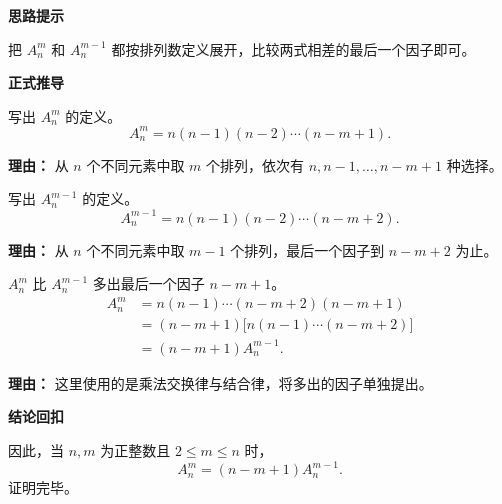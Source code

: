 \begin{proofbox}
\textbf{\textcolor{CProof}{思路提示}}

把 $A_n^m$ 和 $A_n^{m-1}$ 都按排列数定义展开，比较两式相差的最后一个因子即可。

\medskip
\textbf{\textcolor{CProof}{正式推导}}
\begin{description}[style=nextline, leftmargin=2.8em, labelsep=0.5em, itemsep=0.55em]
    \item[\textbf{步骤一（定义展开）：}] 写出 $A_n^m$ 的定义。
    \[
    A_n^m=n(n-1)(n-2)\cdots(n-m+1).
    \]
    \par\textbf{理由：} 从 $n$ 个不同元素中取 $m$ 个排列，依次有 $n,n-1,\ldots,n-m+1$ 种选择。

    \item[\textbf{步骤二（写出 $A_n^{m-1}$）：}] 写出 $A_n^{m-1}$ 的定义。
    \[
    A_n^{m-1}=n(n-1)(n-2)\cdots(n-m+2).
    \]
    \par\textbf{理由：} 从 $n$ 个不同元素中取 $m-1$ 个排列，最后一个因子到 $n-m+2$ 为止。

    \item[\textbf{步骤三（比较乘积）：}] $A_n^m$ 比 $A_n^{m-1}$ 多出最后一个因子 $n-m+1$。
    \[
    \begin{aligned}
    A_n^m
    &=n(n-1)\cdots(n-m+2)(n-m+1)\\
    &=(n-m+1)\bigl[n(n-1)\cdots(n-m+2)\bigr]\\
    &=(n-m+1)A_n^{m-1}.
    \end{aligned}
    \]
    \par\textbf{理由：} 这里使用的是乘法交换律与结合律，将多出的因子单独提出。
\end{description}

\medskip
\textbf{\textcolor{CProof}{结论回扣}}

因此，当 $n,m$ 为正整数且 $2\le m\le n$ 时，
\[
A_n^m=(n-m+1)A_n^{m-1}.
\]
证明完毕。
\end{proofbox}
